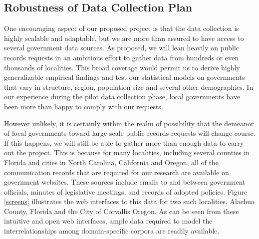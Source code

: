 \subsection{Robustness of Data Collection Plan}

One encouraging aspect of our proposed project is that the data collection is highly scalable and adaptable, but we are more than assured to have access to several government data sources. As proposed, we will lean heavily on public records requests in an ambitious effort to gather data from hundreds or even thousands of localities. This broad coverage would permit us to derive highly generalizable empirical findings and test our statistical models on governments that vary in structure, region, population size and several other demographics. In our experience during the pilot data collection phase, local governments have been more than happy to comply with our requests. 

However unlikely, it is certainly within the realm of possibility that the demeanor of local governments toward large scale public records requests will change course. If this happens, we will still be able to gather more than enough data to carry out the project. This is because for many localities, including several counties in Florida and cities in North Carolina, California and Oregon, all of the communication records that are required for our research are available on government websites. These sources include emails to and between government officials, minutes of legislative meetings, and records of adopted policies. Figure \ref{screens} illustrates the web interfaces to this data for two such localities, Alachua County, Florida and the City of Corvallis Oregon. As can be seen from these intuitive and open web interfaces, ample data required to model the interrelationships among domain-specific corpora are readily available. 

